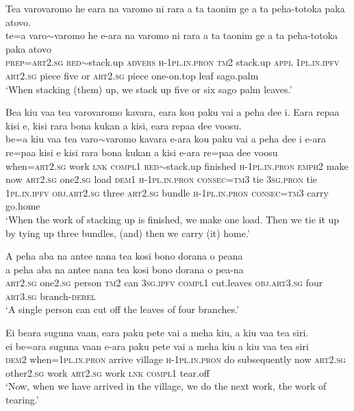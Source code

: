 \ea\label{ex:text12-10}
Tea varovaromo he eara na varomo ni rara a ta taonim ge a ta peha-totoka paka atovo.\\
\gll te=a	varo{$\sim$}varomo	he	e-ara	na	varomo	ni	rara	a	ta	taonim	ge	a	ta	peha-totoka	paka	atovo\\
     \textsc{prep}=\textsc{art}2.\textsc{sg}	\textsc{red}{$\sim$}stack.up	\textsc{advers}	\textsc{h}-1\textsc{pl}.\textsc{in}.\textsc{pron}	\textsc{tm}2	stack.up	\textsc{appl}	1\textsc{pl}.\textsc{in}.\textsc{ipfv}	\textsc{art}2.\textsc{sg}	piece	five	or	\textsc{art}2.\textsc{sg}	piece	one-on.top	leaf	sago.palm\\
\glt `When stacking (them) up, we stack up five or six sago palm leaves.'
\z

\ea\label{ex:text12-11}
Bea kiu vaa tea varovaromo kavara, eara kou paku vai a peha dee i. Eara repaa kisi e, kisi rara bona kukan a kisi, eara repaa dee voosu.\\
\gll be=a	kiu	vaa	tea	varo{$\sim$}varomo	kavara	e-ara	kou	paku	vai	a	peha	dee	i	e-ara	re=paa	kisi	e	kisi	rara	bona	kukan	a	kisi	e-ara	re=paa	dee	voosu\\
     when=\textsc{art}2.\textsc{sg}	work	\textsc{lnk}	\textsc{compl}1	\textsc{red}{$\sim$}stack.up	finished	\textsc{h}-1\textsc{pl}.\textsc{in}.\textsc{pron}	\textsc{emph}2	make	now	\textsc{art}2.\textsc{sg}	one2.\textsc{sg}	load	\textsc{dem}1	\textsc{h}-1\textsc{pl}.\textsc{in}.\textsc{pron}	\textsc{consec}=\textsc{tm}3	tie	3\textsc{sg}.\textsc{pron}	tie	1\textsc{pl}.\textsc{in}.\textsc{ipfv}	\textsc{obj}.\textsc{art}2.\textsc{sg}	three	\textsc{art}2.\textsc{sg}	bundle	\textsc{h}-1\textsc{pl}.\textsc{in}.\textsc{pron}	\textsc{consec}=\textsc{tm}3	carry	go.home\\
\glt `When the work of stacking up is finished, we make one load. Then we tie it up by tying up three bundles, (and) then we carry (it) home.'
\z

\ea\label{ex:text12-12}
A peha aba na antee nana tea kosi bono dorana o peana\\
\gll a	peha	aba	na	antee	nana	tea	kosi	bono	dorana	o	pea-na\\
     \textsc{art}2.\textsc{sg}	one2.\textsc{sg}	person	\textsc{tm}2	can	3\textsc{sg}.\textsc{ipfv}	\textsc{compl}1	cut.leaves	\textsc{obj}.\textsc{art}3.\textsc{sg}	four	\textsc{art}3.\textsc{sg}	branch-\textsc{derel}\\
\glt `A single person can cut off the leaves of four branches.'
\z

\ea\label{ex:text12-13}
Ei beara suguna vaan, eara paku pete vai a meha kiu, a kiu vaa tea siri.\\
\gll ei	be=ara	suguna	vaan	e-ara	paku	pete	vai	a	meha	kiu	a	kiu	vaa	tea	siri\\
     \textsc{dem}2	when=1\textsc{pl}.\textsc{in}.\textsc{pron}	arrive	village	\textsc{h}-1\textsc{pl}.\textsc{in}.\textsc{pron}	do	subsequently	now	\textsc{art}2.\textsc{sg}	other2.\textsc{sg}	work	\textsc{art}2.\textsc{sg}	work	\textsc{lnk}	\textsc{compl}1	tear.off\\
\glt `Now, when we have arrived in the village, we do the next work, the work of tearing.'
\z

